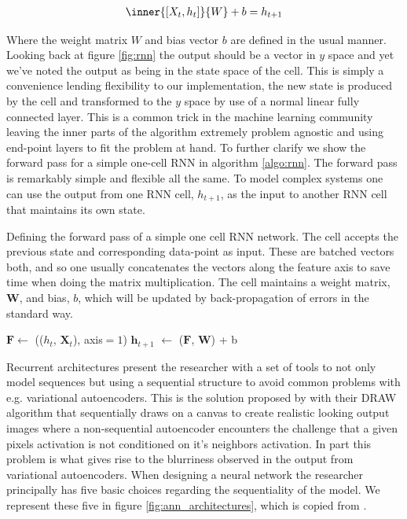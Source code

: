 \begin{align}\label{eq:rnn}
\inner{[X_t, h_t]}{W} + b = h_{t+1}
\end{align}

\noindent Where the weight matrix $W$ and bias vector $b$ are defined in the usual manner. Looking back at figure \ref{fig:rnn} the output should be a vector in $y$ space and yet we've noted the output as being in the state space of the cell. This is simply a convenience lending flexibility to our implementation, the new state is produced by the cell and transformed to the $y$ space by use of a normal linear fully connected layer. This is a common trick in the machine learning community leaving the inner parts of the algorithm extremely problem agnostic and using end-point layers to fit the problem at hand. To further clarify we show the forward pass for a simple one-cell RNN in algorithm \ref{algo:rnn}. The forward pass is remarkably simple and flexible all the same. To model complex systems one can use the output from one RNN cell, $h_{t+1}$, as the input to another RNN cell that maintains its own state. 

\begin{algorithm}[H]
\SetAlgoLined
\caption{Defining the forward pass of a simple one cell RNN network. The cell accepts the previous state and corresponding data-point as input. These are batched vectors both, and so one usually concatenates the vectors along the feature axis to save time when doing the matrix multiplication. The cell maintains a weight matrix, $\mathbf{W}$, and bias, $b$, which will be updated by back-propagation of errors in the standard way.}\label{algo:rnn}
$\mathbf{F} \gets$ (($h_t$, $\mathbf{X}_t$), axis$=1$)\;
$\mathbf{h}_{t+1}$ $\gets$ ($\mathbf{F}$, $\mathbf{W}$) + b\;
\end{algorithm}

\noindent Recurrent architectures present the researcher with a set of tools to not only model sequences but using a sequential structure to avoid common problems with e.g. variational autoencoders. This is the solution proposed by \citet{Gregor2015} with their DRAW algorithm that sequentially draws on a canvas to create realistic looking output images where a non-sequential autoencoder encounters the challenge that a given pixels activation is not conditioned on it's neighbors activation. In part this problem is what gives rise to the blurriness observed in the output from variational autoencoders. When designing a neural network the researcher principally has five basic choices regarding the sequentiality of the model. We represent these five in figure \ref{fig:ann_architectures}, which is copied from \citet{Karpathy2015}.

